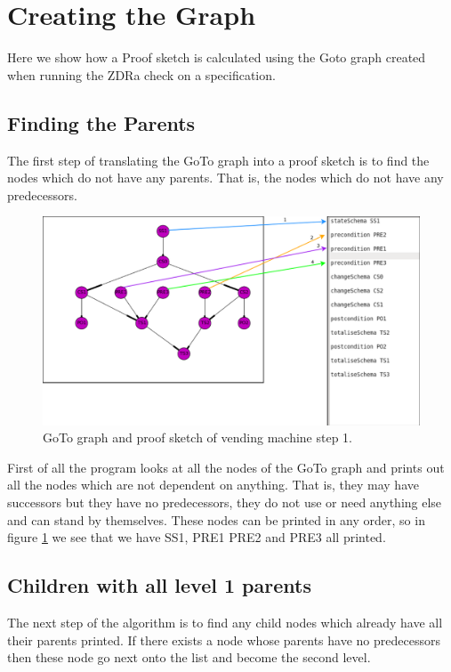 \section{Creating the Graph}

Here we show how a Proof sketch is calculated using the Goto graph created
when running the ZDRa check on a specification.

\subsection{Finding the Parents}
The first step of translating the GoTo graph into a proof sketch is to find
the nodes which do not have any parents. That is, the nodes which do not have any 
predecessors.

\begin{figure}[H]
\includegraphics[scale=0.3]{Figures/skeleton/1.png}
\caption{GoTo graph and proof sketch of vending machine step 1.}
\label{fig:1}
\end{figure}

First of all the program looks at all the nodes of the GoTo graph and prints out
all the nodes which are not dependent on anything. That is, they may have
successors but they have no predecessors, they do not use or need anything else
and can stand by themselves. These nodes can be printed in any order, so in
figure \ref{fig:1} we see that we have SS1, PRE1 PRE2 and PRE3 all printed.

\subsection{Children with all level 1 parents}

The next step of the algorithm is to find any child nodes which already have all
their parents printed. If there exists a node whose parents have no predecessors then these
node go next onto the list and become the second level.

